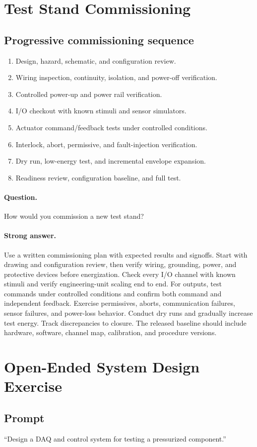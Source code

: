 \documentclass[11pt]{article}
\newcommand{\q}[1]{\paragraph{Question.} #1}
\newcommand{\ans}[1]{\paragraph{Strong answer.} #1}
\begin{document}
\section{Test Stand Commissioning}

\subsection{Progressive commissioning sequence}
\begin{enumerate}
  \item Design, hazard, schematic, and configuration review.
  \item Wiring inspection, continuity, isolation, and power-off verification.
  \item Controlled power-up and power rail verification.
  \item I/O checkout with known stimuli and sensor simulators.
  \item Actuator command/feedback tests under controlled conditions.
  \item Interlock, abort, permissive, and fault-injection verification.
  \item Dry run, low-energy test, and incremental envelope expansion.
  \item Readiness review, configuration baseline, and full test.
\end{enumerate}

\q{How would you commission a new test stand?}
\ans{Use a written commissioning plan with expected results and signoffs. Start
with drawing and configuration review, then verify wiring, grounding, power, and
protective devices before energization. Check every I/O channel with known
stimuli and verify engineering-unit scaling end to end. For outputs, test
commands under controlled conditions and confirm both command and independent
feedback. Exercise permissives, aborts, communication failures, sensor failures,
and power-loss behavior. Conduct dry runs and gradually increase test energy.
Track discrepancies to closure. The released baseline should include hardware,
software, channel map, calibration, and procedure versions.}

\section{Open-Ended System Design Exercise}

\subsection{Prompt}
``Design a DAQ and control system for testing a pressurized component.''
\end{document}
